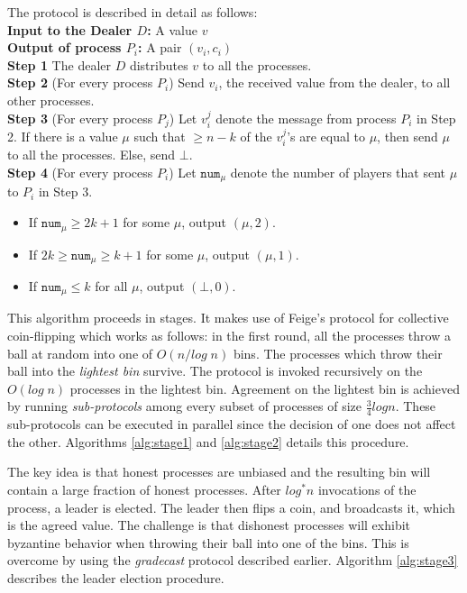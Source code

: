 The protocol is described in detail as follows: \\
\textbf{Input to the Dealer $D$:} A value $v$  \\
\textbf{Output of process $P_i$:} A pair $(v_i, c_i)$ \\
\textbf{Step 1} The dealer $D$ distributes $v$ to all the processes. \\
\textbf{Step 2} (For every process $P_i$) Send $v_i$, the received value from the dealer, to all other processes.  \\
\textbf{Step 3} (For every process $P_j$) Let $v_i^j$ denote the message from process $P_i$ in Step 2. If there is a value $\mu$ such that $\geq n - k$ of the $v_i^j$'s are equal to $\mu$, then send $\mu$ to all the processes. Else, send $\bot$. \\
\textbf{Step 4} (For every process $P_i$) Let $\mathtt{num}_\mu$ denote the number of players that sent $\mu$ to $P_i$ in Step 3. \\
\begin{itemize}
\item If $\mathtt{num}_\mu \geq 2k + 1$ for some $\mu$, output $(\mu, 2)$.
\item If $2k \geq \mathtt{num}_\mu \geq k + 1$ for some $\mu$, output $(\mu, 1)$.
\item If $\mathtt{num}_\mu \leq k $ for all $\mu$, output $(\bot, 0)$.
\end{itemize}



This algorithm proceeds in stages. It makes use of Feige's protocol \cite{Feige99} for collective coin-flipping which works as follows: in the first round, all the processes throw a ball at random into one of $O(n/log\;n)$ bins. The processes which throw their ball into the \textit{lightest bin} survive. The protocol is invoked recursively on the $O(log\;n)$ processes in the lightest bin. Agreement on the lightest bin is achieved by running \textit{sub-protocols} among every subset of processes of size $\frac{3}{4}logn$. These sub-protocols can be executed in parallel since the decision of one does not affect the other. Algorithms \ref{alg:stage1} and \ref{alg:stage2} details this procedure.





The key idea is that honest processes are unbiased and the resulting bin will contain a large fraction of honest processes. After $log^* n$ invocations of the process, a leader is elected. The leader then flips a coin, and broadcasts it, which is the agreed value. The challenge is that dishonest processes will exhibit byzantine behavior when throwing their ball into one of the bins. This is overcome by using the \textit{gradecast} protocol described earlier. Algorithm \ref{alg:stage3} describes the leader election procedure.


